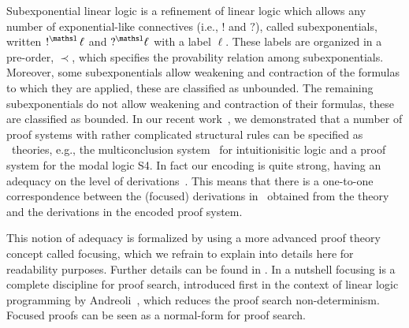 \documentclass[a4paper,10pt]{article}
\begin{document}
Subexponential linear logic is a refinement of linear logic which allows any
number of exponential-like connectives (i.e., $!$ and $?$), called
subexponentials, written $\nbang{\ell}$ and $\nquest{\ell}$ with a label $\ell$.
These labels are organized in a pre-order, $\prec$, which specifies the
provability relation among subexponentials. Moreover, some subexponentials allow
weakening and contraction of the formulas to which they are applied, these are
classified as unbounded. The remaining subexponentials do not allow weakening
and contraction of their formulas, these are classified as bounded. 
In our recent work~\cite{nigam.jlc}, we demonstrated that a number of proof
systems with rather complicated structural rules can be specified as \sell\
theories, e.g., the multiconclusion system \mLJ\ for intuitionisitic logic and a
proof system for the modal logic S4.
In fact our encoding is quite strong, having an adequacy on the level of 
derivations~\cite{nigam10jar}. This means that there is a one-to-one correspondence
between the (focused) derivations in \sell\ obtained from the theory and the
derivations in the encoded proof system.

This notion of adequacy is formalized by using a more advanced proof theory
concept called focusing, which we refrain to explain into details here for
readability purposes. Further details can be found in \cite{nigam.jlc}. In a
nutshell focusing is a complete discipline for proof search, introduced first in
the context of linear logic programming by Andreoli~\cite{andreoli92jlc}, which
reduces the proof search non-determinism. Focused proofs can be seen as a
normal-form for proof search. 
\end{document}
